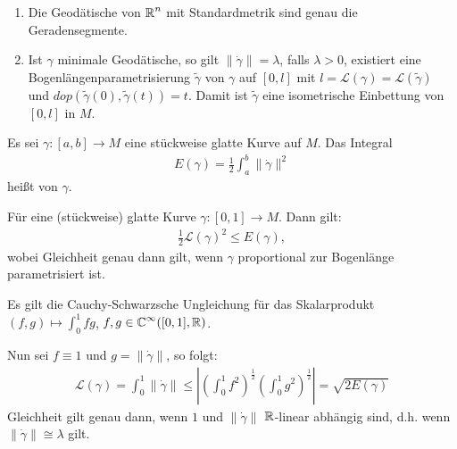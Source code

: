 
\begin{bem}
  \begin{enumerate}[label=(\arabic*)]
  \item Die Geodätische von $\operatorname{\mathbb{R}}^n$ mit Standardmetrik sind genau die Geradensegmente.
  \item Ist $\gamma$ minimale Geodätische, so gilt $\|\dot\gamma\| = \lambda$, falls $\lambda > 0$, existiert eine Bogenlängenparametrisierung $\tilde\gamma$ von $\gamma$ auf $[0,l]$ mit $l = \mathcal L(\gamma) = \mathcal L(\tilde\gamma)$ und $dop(\tilde\gamma(0),\tilde\gamma(t)) = t$.
    Damit ist $\tilde\gamma$ eine isometrische Einbettung von $[0,l]$ in $M$.
  \end{enumerate}
\end{bem}

\begin{Dfn}
  Es sei $\gamma \colon [a,b] \to M$ eine stückweise glatte Kurve auf $M$.
  Das Integral
  \begin{align*}
    E(\gamma) = \frac{1}2 \int_a^b\|\dot\gamma\|^2
  \end{align*}
  heißt  von $\gamma$.
\end{Dfn}

\begin{Lemma}
  Für eine (stückweise) glatte Kurve $\gamma \colon [0,1] \to M$.
  Dann gilt:
  \begin{align*}
    \frac{1}2 \mathcal L(\gamma)^2 \leq E(\gamma),
  \end{align*}
  wobei Gleichheit genau dann gilt, wenn $\gamma$ proportional zur Bogenlänge parametrisiert ist.
\end{Lemma}

\begin{bew}
  Es gilt die Cauchy-Schwarzsche Ungleichung für das Skalarprodukt $(f,g) \mapsto \int_0^1 fg$, $f,g \in \operatorname{\mathbb{C}}^{\infty}([0,1], \operatorname{\mathbb{R}})$.

  Nun sei $f \equiv 1$ und $g = \|\dot\gamma\|$, so folgt:
  \begin{align*}
    \mathcal L(\gamma) = \int_0^1 \|\dot\gamma\| \leq \left|\left(\int_0^1 f^2\right)^{\frac{1}2} \left(\int_0^1g^2\right)^{\frac{1}2}\right| = \sqrt{2 E(\gamma)}
  \end{align*}
  Gleichheit gilt genau dann, wenn $1$ und $\|\dot\gamma\|$ $\operatorname{\mathbb{R}}$-linear abhängig sind, d.h. wenn $\|\dot\gamma\| \cong \lambda$ gilt.
\end{bew}

